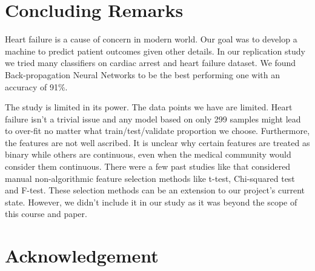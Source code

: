 \documentclass{article}
\begin{document}
\section{Concluding Remarks}

Heart failure is a cause of concern in modern world. Our goal was to develop a machine to predict patient outcomes given other details. In our replication study we tried many classifiers on cardiac arrest and heart failure dataset. We found Back-propagation Neural Networks to be the best performing one with an accuracy of 91\%. 

The study is limited in its power. The data points we have are limited. Heart failure isn't a trivial issue and any model based on only 299 samples might lead to over-fit no matter what train/test/validate proportion we choose. Furthermore, the features are not well ascribed. It is unclear why certain features are treated as binary while others are continuous, even when the medical community would consider them continuous. There were a few past studies like \citet{awan2019feature} that considered manual non-algorithmic feature selection methods like t-test, Chi-squared test and F-test. These selection methods can be an extension to our project's current state. However, we didn't include it in our study as it was beyond the scope of this course and paper.

\citet{awan2019feature}

 





\section*{Acknowledgement}
\end{document}
